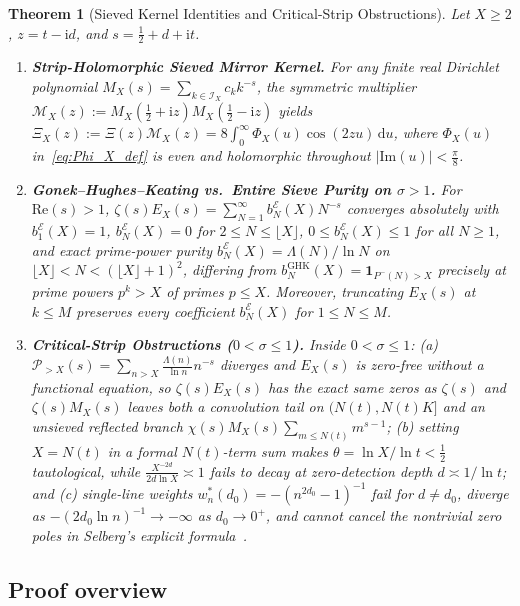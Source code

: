\documentclass[11pt,reqno]{amsart}
\newtheorem{theorem}{Theorem}[section]
\theoremstyle{definition}
\theoremstyle{remark}
\numberwithin{equation}{section}
\newcommand{\dd}{\mathrm{d}}
\newcommand{\ii}{\mathrm{i}}
\newcommand{\Rea}{\mathrm{Re}}
\newcommand{\Ima}{\mathrm{Im}}
\begin{document}
\begin{theorem}[Sieved Kernel Identities and Critical-Strip Obstructions]\label{thm:main_p6}
Let $X \ge 2$, $z = t - \ii d$, and $s = \frac{1}{2} + d + \ii t$.
\begin{enumerate}[label=\textup{(\roman*)},leftmargin=2.2em]
\item \textbf{Strip-Holomorphic Sieved Mirror Kernel.} For any finite real Dirichlet polynomial $M_X(s) = \sum_{k \in \mathcal{I}_X} c_k k^{-s}$, the symmetric multiplier $\mathcal{M}_X(z) := M_X(\frac{1}{2}+\ii z)M_X(\frac{1}{2}-\ii z)$ yields $\Xi_X(z) := \Xi(z)\mathcal{M}_X(z) = 8\int_0^{\infty} \Phi_X(u)\cos(2zu)\,\dd u$, where $\Phi_X(u)$ in~\eqref{eq:Phi_X_def} is even and holomorphic throughout $\lvert\Ima(u)\rvert < \frac{\pi}{8}$.
\item \textbf{Gonek--Hughes--Keating vs.\ Entire Sieve Purity on $\sigma > 1$.} For $\Rea(s) > 1$, $\zeta(s)E_X(s) = \sum_{N=1}^{\infty} b_N^{\mathcal{E}}(X)N^{-s}$ converges absolutely with $b_1^{\mathcal{E}}(X) = 1$, $b_N^{\mathcal{E}}(X) = 0$ for $2 \le N \le \lfloor X\rfloor$, $0 \le b_N^{\mathcal{E}}(X) \le 1$ for all $N \ge 1$, and exact prime-power purity $b_N^{\mathcal{E}}(X) = \Lambda(N)/\ln N$ on $\lfloor X\rfloor < N < (\lfloor X\rfloor+1)^2$, differing from $b_N^{\mathrm{GHK}}(X) = \mathbf{1}_{P^-(N) > X}$ precisely at prime powers $p^k > X$ of primes $p \le X$. Moreover, truncating $E_X(s)$ at $k \le M$ preserves every coefficient $b_N^{\mathcal{E}}(X)$ for $1 \le N \le M$.
\item \textbf{Critical-Strip Obstructions ($0 < \sigma \le 1$).} Inside $0 < \sigma \le 1$: (a) $\mathcal{P}_{>X}(s) = \sum_{n > X} \frac{\Lambda(n)}{\ln n}n^{-s}$ diverges and $E_X(s)$ is zero-free without a functional equation, so $\zeta(s)E_X(s)$ has the exact same zeros as $\zeta(s)$ and $\zeta(s)M_X(s)$ leaves both a convolution tail on $(N(t), N(t)K]$ and an unsieved reflected branch $\chi(s)M_X(s)\sum_{m \le N(t)} m^{s-1}$; (b) setting $X = N(t)$ in a formal $N(t)$-term sum makes $\theta = \ln X/\ln t < \frac{1}{2}$ tautological, while $\frac{X^{-2d}}{2d\ln X} \asymp 1$ fails to decay at zero-detection depth $d \asymp 1/\ln t$; and (c) single-line weights $w_n^*(d_0) = -(n^{2d_0}-1)^{-1}$ fail for $d \ne d_0$, diverge as $-(2d_0\ln n)^{-1} \to -\infty$ as $d_0 \to 0^+$, and cannot cancel the nontrivial zero poles in Selberg's explicit formula~\cite{selberg1946}.
\end{enumerate}
\end{theorem}

\subsection{Proof overview}\label{subsec:proof_overview}
\end{document}
